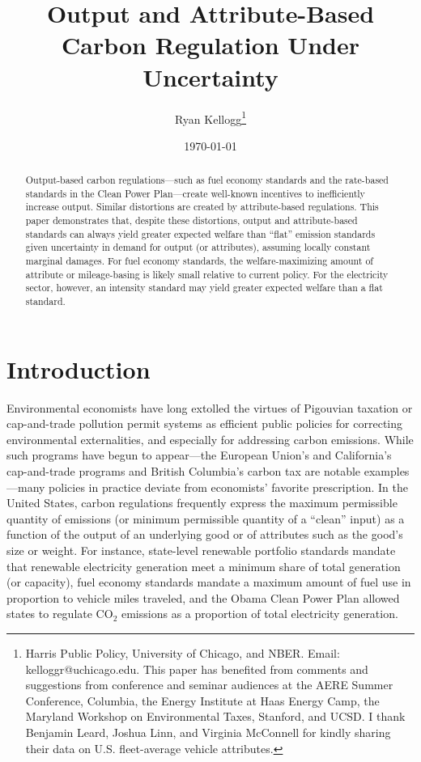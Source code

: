 \documentclass[12pt]{article}
\title{Output and Attribute-Based Carbon Regulation Under Uncertainty}
\author{Ryan Kellogg\footnote{Harris Public Policy, University of Chicago, and NBER. Email: kelloggr@uchicago.edu. This paper has benefited from comments and suggestions from conference and seminar audiences at the AERE Summer Conference, Columbia, the Energy Institute at Haas Energy Camp, the Maryland Workshop on Environmental Taxes, Stanford, and UCSD. I thank Benjamin Leard, Joshua Linn, and Virginia McConnell for kindly sharing their data on U.S. fleet-average vehicle attributes.}}
\date{\today}
\begin{document}

\maketitle

\thispagestyle{empty}	


\begin{abstract}
Output-based carbon regulations---such as fuel economy standards and the rate-based standards in the Clean Power Plan---create well-known incentives to inefficiently increase output. Similar distortions are created by attribute-based regulations. This paper demonstrates that, despite these distortions, output and attribute-based standards can always yield greater expected welfare than ``flat'' emission standards given uncertainty in demand for output (or attributes), assuming locally constant marginal damages. For fuel economy standards, the welfare-maximizing amount of attribute or mileage-basing is likely small relative to current policy. For the electricity sector, however, an intensity standard may yield greater expected welfare than a flat standard.
\end{abstract}


\newpage


\doublespace

\section{Introduction \label{sec:Intro}}

Environmental economists have long extolled the virtues of Pigouvian taxation or cap-and-trade pollution permit systems as efficient public policies for correcting environmental externalities, and especially for addressing carbon emissions. While such programs have begun to appear---the European Union's and California's cap-and-trade programs and British Columbia's carbon tax are notable examples---many policies in practice deviate from economists' favorite prescription. In the United States, carbon regulations frequently express the maximum permissible quantity of emissions (or minimum permissible quantity of a ``clean'' input) as a function of the output of an underlying good or of attributes such as the good's size or weight. For instance, state-level renewable portfolio standards mandate that renewable electricity generation meet a minimum share of total generation (or capacity), fuel economy standards mandate a maximum amount of fuel use in proportion to vehicle miles traveled, and the Obama Clean Power Plan allowed states to regulate CO$_{\text{2}}$ emissions as a proportion of total electricity generation.
\end{document}
